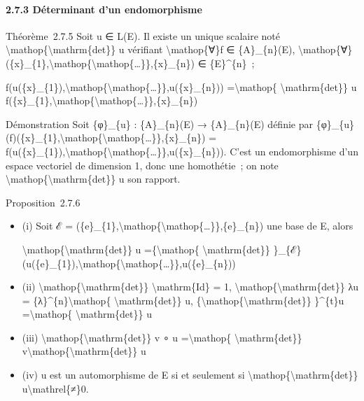 \documentclass[]{article}
\begin{document}
\paragraph{2.7.3 Déterminant d'un endomorphisme}

Théorème~2.7.5 Soit u ∈ L(E). Il existe un unique scalaire noté
\textbackslash{}mathop\{\textbackslash{}mathrm\{det\}\} u vérifiant
\textbackslash{}mathop\{∀\}f ∈ \{A\}\_\{n\}(E),
\textbackslash{}mathop\{∀\}(\{x\}\_\{1\},\textbackslash{}mathop\{\textbackslash{}mathop\{\ldots{}\}\},\{x\}\_\{n\})
∈ \{E\}\^{}\{n\}~;

f(u(\{x\}\_\{1\}),\textbackslash{}mathop\{\textbackslash{}mathop\{\ldots{}\}\},u(\{x\}\_\{n\}))
=\textbackslash{}mathop\{ \textbackslash{}mathrm\{det\}\} u
f(\{x\}\_\{1\},\textbackslash{}mathop\{\textbackslash{}mathop\{\ldots{}\}\},\{x\}\_\{n\})

Démonstration Soit \{φ\}\_\{u\} : \{A\}\_\{n\}(E) → \{A\}\_\{n\}(E)
définie par
\{φ\}\_\{u\}(f)(\{x\}\_\{1\},\textbackslash{}mathop\{\textbackslash{}mathop\{\ldots{}\}\},\{x\}\_\{n\})
=
f(u(\{x\}\_\{1\}),\textbackslash{}mathop\{\textbackslash{}mathop\{\ldots{}\}\},u(\{x\}\_\{n\})).
C'est un endomorphisme d'un espace vectoriel de dimension 1, donc une
homothétie~; on note
\textbackslash{}mathop\{\textbackslash{}mathrm\{det\}\} u son rapport.

Proposition~2.7.6

\begin{itemize}
\item
  (i) Soit ℰ =
  (\{e\}\_\{1\},\textbackslash{}mathop\{\textbackslash{}mathop\{\ldots{}\}\},\{e\}\_\{n\})
  une base de E, alors

  \textbackslash{}mathop\{\textbackslash{}mathrm\{det\}\} u
  =\{\textbackslash{}mathop\{ \textbackslash{}mathrm\{det\}\}
  \}\_\{ℰ\}(u(\{e\}\_\{1\}),\textbackslash{}mathop\{\textbackslash{}mathop\{\ldots{}\}\},u(\{e\}\_\{n\}))
\item
  (ii) \textbackslash{}mathop\{\textbackslash{}mathrm\{det\}\}
  \textbackslash{}mathrm\{Id\} = 1,
  \textbackslash{}mathop\{\textbackslash{}mathrm\{det\}\} λu =
  \{λ\}\^{}\{n\}\textbackslash{}mathop\{ \textbackslash{}mathrm\{det\}\}
  u, \{\textbackslash{}mathop\{\textbackslash{}mathrm\{det\}\}
  \}\^{}\{t\}u =\textbackslash{}mathop\{ \textbackslash{}mathrm\{det\}\}
  u
\item
  (iii) \textbackslash{}mathop\{\textbackslash{}mathrm\{det\}\} v ∘ u
  =\textbackslash{}mathop\{ \textbackslash{}mathrm\{det\}\}
  v\textbackslash{}mathop\{\textbackslash{}mathrm\{det\}\} u
\item
  (iv) u est un automorphisme de E si et seulement si
  \textbackslash{}mathop\{\textbackslash{}mathrm\{det\}\}
  u\textbackslash{}mathrel\{≠\}0.
\end{itemize}
\end{document}
